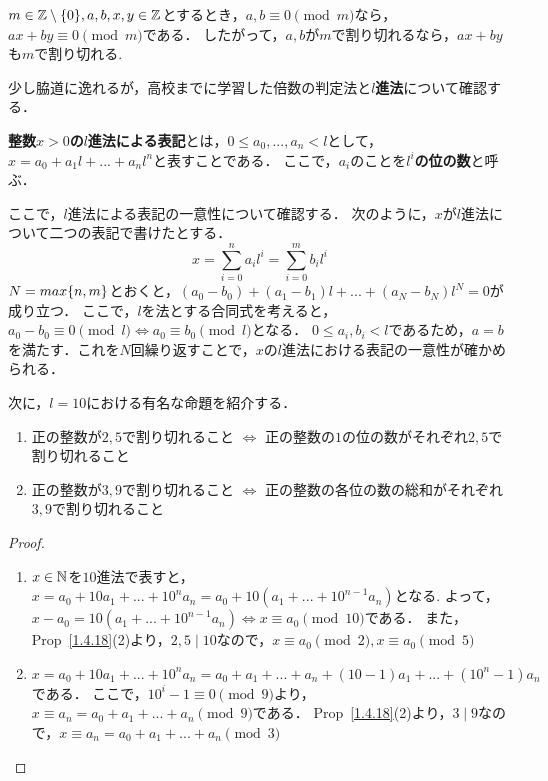     \begin{cor} \label{1.4.19}
      $ m \in \mathbb{Z} \setminus \lbrace0\rbrace, a,b,x,y \in \mathbb{Z}$とするとき，$a,b \equiv 0 \pmod m$なら，
      $ax + by \equiv 0 \pmod m$である．
      したがって，$a,b$が$m$で割り切れるなら，$ax+by$も$m$で割り切れる.
    \end{cor}

    少し脇道に逸れるが，高校までに学習した倍数の判定法と\textbf{$l$進法}について確認する．

    \begin{dfn} \label{1.4.20}
      \textbf{整数$x>0$の$l$進法による表記}とは，$0 \leq a_0, ... , a_n < l$として，
      $x = a_0 + a_1 l + ... + a_n l^n$と表すことである．
      ここで，$a_i$のことを\textbf{$l^i$の位の数}と呼ぶ．
    \end{dfn}

    ここで，$l$進法による表記の一意性について確認する．
    次のように，$x$が$l$進法について二つの表記で書けたとする．
    \begin{displaymath}
      x = \sum_{i=0}^{n}a_i l^i = \sum_{i=0}^{m}b_i l^i
    \end{displaymath}
    $N = max \lbrace n, m\rbrace$とおくと，$(a_0 - b_0) + (a_1 - b_1) l + ... + (a_N - b_N) l^N = 0$が成り立つ．
    ここで，$l$を法とする合同式を考えると，$a_0 - b_0 \equiv 0 \pmod l \iff a_0 \equiv b_0 \pmod l$となる．
    $0 \leq a_i, b_i < l$であるため，$a=b$を満たす．これを$N$回繰り返すことで，$x$の$l$進法における表記の一意性が確かめられる．

    次に，$l=10$における有名な命題を紹介する．

    \begin{prop} \label{1.4.21}
      \begin{enumerate}
        \item 正の整数が$2,5$で割り切れること $\iff$ 正の整数の$1$の位の数がそれぞれ$2,5$で割り切れること
        \item 正の整数が$3,9$で割り切れること $\iff$ 正の整数の各位の数の総和がそれぞれ$3,9$で割り切れること
      \end{enumerate}
    \end{prop}

    \begin{proof}
      \begin{enumerate}
        \item $x \in \mathbb{N}$を$10$進法で表すと，$x=a_0 + 10a_1 + ... + 10^n a_n = a_0 + 10(a_1 + ... + 10^{n-1}a_n)$となる.
        よって，$x-a_0 = 10(a_1 + ... + 10^{n-1}a_n) \iff x \equiv a_0 \pmod {10}$である．
        また，Prop~\ref{1.4.18}(2)より，$2,5 \mid 10$なので，$x \equiv a_0 \pmod 2, x \equiv a_0 \pmod 5$
        \item $x = a_0 + 10a_1 + ... + 10^n a_n = a_0 + a_1 + ... + a_n + (10 - 1)a_1 + ... + (10^n - 1) a_n$である．
        ここで，$10^i - 1 \equiv 0 \pmod 9$より，$x \equiv a_n = a_0 + a_1 + ... + a_n \pmod 9$である．
        Prop~\ref{1.4.18}(2)より，$3 \mid 9$なので，$x \equiv a_n = a_0 + a_1 + ... + a_n \pmod 3$
      \end{enumerate}
    \end{proof}

